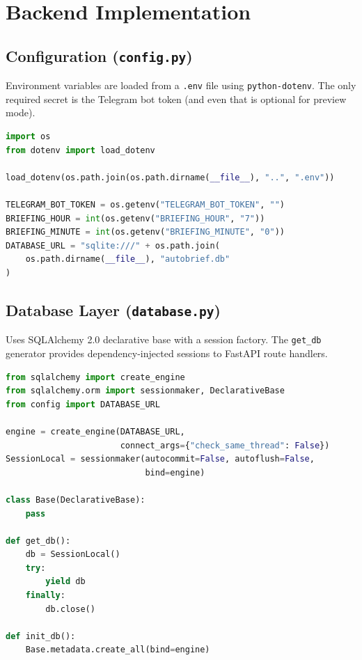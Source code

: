 \documentclass[12pt, a4paper]{article}
\begin{document}
\section{Backend Implementation}

\subsection{Configuration (\texttt{config.py})}

Environment variables are loaded from a \texttt{.env} file using \texttt{python-dotenv}. The only required secret is the Telegram bot token (and even that is optional for preview mode).

\begin{lstlisting}[language=Python, title={config.py}]
import os
from dotenv import load_dotenv

load_dotenv(os.path.join(os.path.dirname(__file__), "..", ".env"))

TELEGRAM_BOT_TOKEN = os.getenv("TELEGRAM_BOT_TOKEN", "")
BRIEFING_HOUR = int(os.getenv("BRIEFING_HOUR", "7"))
BRIEFING_MINUTE = int(os.getenv("BRIEFING_MINUTE", "0"))
DATABASE_URL = "sqlite:///" + os.path.join(
    os.path.dirname(__file__), "autobrief.db"
)
\end{lstlisting}

\subsection{Database Layer (\texttt{database.py})}

Uses SQLAlchemy 2.0 declarative base with a session factory. The \texttt{get\_db} generator provides dependency-injected sessions to FastAPI route handlers.

\begin{lstlisting}[language=Python, title={database.py}]
from sqlalchemy import create_engine
from sqlalchemy.orm import sessionmaker, DeclarativeBase
from config import DATABASE_URL

engine = create_engine(DATABASE_URL,
                       connect_args={"check_same_thread": False})
SessionLocal = sessionmaker(autocommit=False, autoflush=False,
                            bind=engine)

class Base(DeclarativeBase):
    pass

def get_db():
    db = SessionLocal()
    try:
        yield db
    finally:
        db.close()

def init_db():
    Base.metadata.create_all(bind=engine)
\end{lstlisting}
\end{document}

